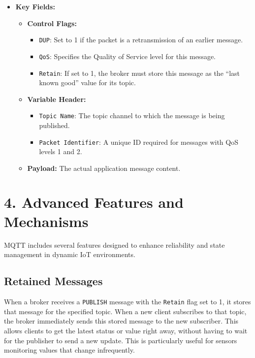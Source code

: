 \documentclass[a4paper, 12pt]{book} %
\begin{document}
\begin{itemize}
\tightlist
\item
  \textbf{Key Fields:}

  \begin{itemize}
  \tightlist
  \item
    \textbf{Control Flags:}

    \begin{itemize}
    \tightlist
    \item
      \texttt{DUP}: Set to 1 if the packet is a retransmission of an
      earlier message.
    \item
      \texttt{QoS}: Specifies the Quality of Service level for this
      message.
    \item
      \texttt{Retain}: If set to 1, the broker must store this message
      as the ``last known good'' value for its topic.
    \end{itemize}
  \item
    \textbf{Variable Header:}

    \begin{itemize}
    \tightlist
    \item
      \texttt{Topic\ Name}: The topic channel to which the message is
      being published.
    \item
      \texttt{Packet\ Identifier}: A unique ID required for messages
      with QoS levels 1 and 2.
    \end{itemize}
  \item
    \textbf{Payload:} The actual application message content.
  \end{itemize}
\end{itemize}

\section{4. Advanced Features and
Mechanisms}\label{advanced-features-and-mechanisms}

MQTT includes several features designed to enhance reliability and state
management in dynamic IoT environments.

\subsection{Retained Messages}\label{retained-messages}

When a broker receives a \texttt{PUBLISH} message with the
\texttt{Retain} flag set to 1, it stores that message for the specified
topic. When a new client subscribes to that topic, the broker
immediately sends this stored message to the new subscriber. This allows
clients to get the latest status or value right away, without having to
wait for the publisher to send a new update. This is particularly useful
for sensors monitoring values that change infrequently.
\end{document}
